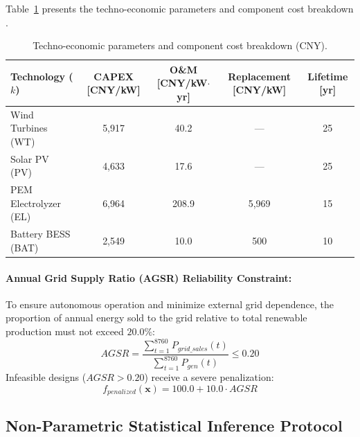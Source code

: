 Table~\ref{tab:hres2_costs} presents the techno-economic parameters and component cost breakdown \cite{li2024capacity}.

\begin{table}[htbp]
\centering
\caption{Techno-economic parameters and component cost breakdown (CNY).}
\label{tab:hres2_costs}
\begin{tabular}{lcccc}
\toprule
\textbf{Technology ($k$)} & \textbf{CAPEX [CNY/kW]} & \textbf{O\&M [CNY/kW$\cdot$yr]} & \textbf{Replacement [CNY/kW]} & \textbf{Lifetime [yr]} \\
\midrule
Wind Turbines (WT) & 5,917 & 40.2 & --- & 25 \\
Solar PV (PV) & 4,633 & 17.6 & --- & 25 \\
PEM Electrolyzer (EL) & 6,964 & 208.9 & 5,969 & 15 \\
Battery BESS (BAT) & 2,549 & 10.0 & 500 & 10 \\
\bottomrule
\end{tabular}
\end{table}

\paragraph{Annual Grid Supply Ratio (AGSR) Reliability Constraint:}
To ensure autonomous operation and minimize external grid dependence, the proportion of annual energy sold to the grid relative to total renewable production must not exceed $20.0\%$:
\begin{equation}
AGSR = \frac{\displaystyle\sum_{t=1}^{8760} P_{grid\_sales}(t)}{\displaystyle\sum_{t=1}^{8760} P_{gen}(t)} \le 0.20
\label{eq:agsr_constraint}
\end{equation}
Infeasible designs ($AGSR > 0.20$) receive a severe penalization:
\begin{equation}
f_{penalized}(\mathbf{x}) = 100.0 + 10.0 \cdot AGSR
\label{eq:penalty_function}
\end{equation}

\subsection{Non-Parametric Statistical Inference Protocol}
\label{sec:statistical_protocol}

